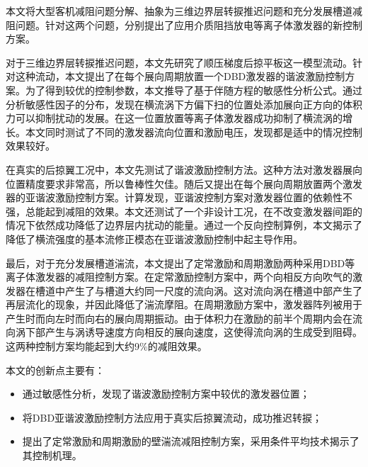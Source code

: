 \begin{cabstract}
  本文将大型客机减阻问题分解、抽象为三维边界层转捩推迟问题和充分发展槽道减阻问题。针对这两个问题，分别提出了应用介质阻挡放电等离子体激发器的新控制方案。

  对于三维边界层转捩推迟问题，本文先研究了顺压梯度后掠平板这一模型流动。针对这种流动，本文提出了在每个展向周期放置一个DBD激发器的谐波激励控制方案。为了得到较优的控制参数，本文推导了基于伴随方程的敏感性分析公式。通过分析敏感性因子的分布，发现在横流涡下方偏下扫的位置处添加展向正方向的体积力可以抑制扰动的发展。在这一位置放置等离子体激发器成功抑制了横流涡的增长。本文同时测试了不同的激发器流向位置和激励电压，发现都是适中的情况控制效果较好。

  在真实的后掠翼工况中，本文先测试了谐波激励控制方法。这种方法对激发器展向位置精度要求非常高，所以鲁棒性欠佳。随后又提出在每个展向周期放置两个激发器的亚谐波激励控制方案。计算发现，亚谐波控制方案对激发器位置的依赖性不强，总能起到减阻的效果。本文还测试了一个非设计工况，在不改变激发器间距的情况下依然成功降低了边界层内扰动的能量。通过一个反向控制算例，本文揭示了降低了横流强度的基本流修正模态在亚谐波激励控制中起主导作用。

  最后，对于充分发展槽道湍流，本文提出了定常激励和周期激励两种采用DBD等离子体激发器的减阻控制方案。在定常激励控制方案中，两个向相反方向吹气的激发器在槽道中产生了与槽道大约同一尺度的流向涡。这对流向涡在槽道中部产生了再层流化的现象，并因此降低了湍流摩阻。在周期激励方案中，激发器阵列被用于产生时而向左时而向右的展向周期振动。由于体积力在激励的前半个周期内会在流向涡下部产生与涡诱导速度方向相反的展向速度，这使得流向涡的生成受到阻碍。这两种控制方案均能起到大约9\%的减阻效果。

  本文的创新点主要有：
  \begin{itemize}
    \item 通过敏感性分析，发现了谐波激励控制方案中较优的激发器位置；
    \item 将DBD亚谐波激励控制方法应用于真实后掠翼流动，成功推迟转捩；
    \item 提出了定常激励和周期激励的壁湍流减阻控制方案，采用条件平均技术揭示了其控制机理。
  \end{itemize}
\end{cabstract}



